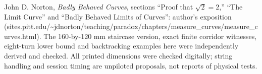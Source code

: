 John D. Norton, \emph{Badly Behaved Curves}, sections ``Proof that $\sqrt2=2$,'' ``The Limit Curve'' and ``Badly Behaved Limits of Curves'': author's exposition (sites.pitt.edu/\textasciitilde jdnorton/teaching/paradox/chapters/measure\_curves/measure\_curves.html). The 160-by-120 mm staircase version, exact finite corridor witnesses, eight-turn lower bound and backtracking examples here were independently derived and checked. All printed dimensions were checked digitally; string handling and session timing are unpiloted proposals, not reports of physical tests.
